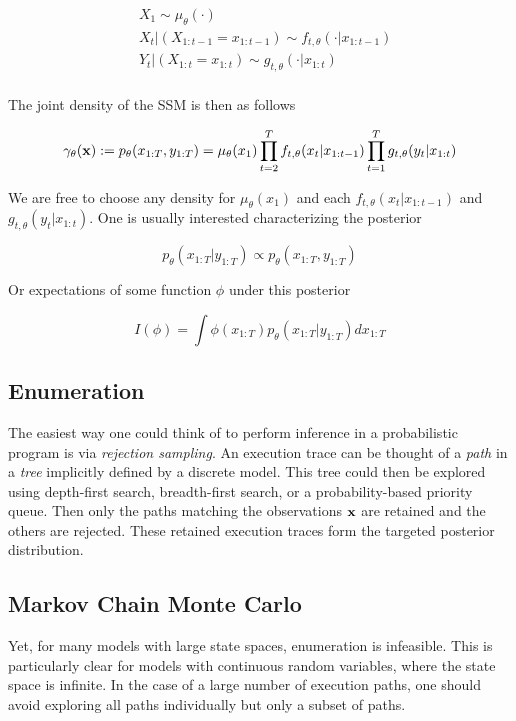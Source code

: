 \begin{equation*}
\begin{aligned}
& X_1 \sim \mu_\theta(\cdot) \\
& X_t|(X_{1:t-1} = x_{1:t-1}) \sim f_{t,\theta}(\cdot|x_{1:t-1}) \\
& Y_t|(X_{1:t} = x_{1:t}) \sim g_{t,\theta}(\cdot|x_{1:t}) \\
\end{aligned}
\end{equation*}

The joint density of the \gls{SSM} is then as follows

$$ \gamma_\theta(\boldsymbol{\mathbf{x}}) := p_\theta(x_{1:T},y_{1:T}) = \mu_\theta(x_1) \prod_{t=2}^T f_{t,\theta}(x_t|x_{1:t-1}) \prod_{t=1}^T g_{t,\theta}(y_t|x_{1:t}) $$

We are free to choose any density for $\mu_\theta(x_1)$ and each $f_{t,\theta}(x_t|x_{1:t-1})$ and $g_{t,\theta}(y_t|x_{1:t})$. One is usually interested characterizing the posterior

$$ p_\theta(x_{1:T}|y_{1:T}) \propto p_\theta(x_{1:T},y_{1:T}) $$

Or expectations of some function $\phi$ under this posterior

$$ I(\phi) = \int \phi(x_{1:T}) p_\theta(x_{1:T}|y_{1:T}) dx_{1:T} $$

\subsection{Enumeration}
The easiest way one could think of to perform inference in a probabilistic program is via \textit{rejection sampling}. An execution trace can be thought of a \textit{path} in a \textit{tree} implicitly defined by a discrete model. This tree could then be explored using depth-first search, breadth-first search, or a probability-based priority queue. Then only the paths matching the observations $\boldsymbol{\mathbf{x}}$ are retained and the others are rejected. These retained execution traces form the targeted posterior distribution.

\subsection{Markov Chain Monte Carlo}
Yet, for many models with large state spaces, enumeration is infeasible. This is particularly clear for models with continuous random variables, where the state space is infinite.
In the case of a large number of execution paths, one should avoid exploring all paths individually but only a subset of paths.

